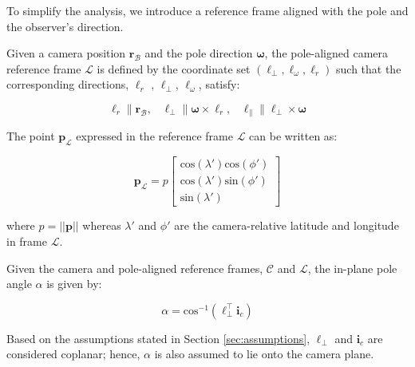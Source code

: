 To simplify the analysis, we introduce a reference frame aligned with the pole and the observer's direction.

\begin{definition}
    \label{eq:L_frame}
    Given a camera position $\mathbf{r}_\mathcal{B}$ and the pole direction $\boldsymbol{\omega}$, the pole-aligned camera reference frame $\mathcal{L}$ is defined by the coordinate set $(\ell_\perp,\ell_\omega,\ell_r)$ such that the corresponding directions, $\boldsymbol{\ell}_r$ , $\boldsymbol{\ell}_\perp$, $\boldsymbol{\ell}_\omega$, satisfy:

    \begin{equation}
        \boldsymbol{\ell}_r \parallel \mathbf{r}_\mathcal{B},\;\;\; \boldsymbol{\ell}_\perp \parallel \boldsymbol{\omega} \times \boldsymbol{\ell}_r,\;\;\; \boldsymbol{\ell}_\parallel \parallel \boldsymbol{\ell}_\perp \times \boldsymbol{\omega}
    \end{equation}

    The point $\mathbf{p}_\mathcal{L}$ expressed in the reference frame $\mathcal{L}$ can be written as:

    \begin{equation}
    \label{eq:p_L}
        \mathbf{p}_\mathcal{L} = p
        \begin{bmatrix}
            \mathrm{cos}(\lambda')\mathrm{cos}(\phi')\\
            \mathrm{cos}(\lambda')\mathrm{sin}(\phi')\\
            \mathrm{sin}(\lambda')
        \end{bmatrix}
    \end{equation}

    where $p=||\mathbf{p}||$ whereas $\lambda'$ and $\phi'$ are the camera-relative latitude and longitude in frame $\mathcal{L}$.
\end{definition}

\begin{definition}
    Given the camera and pole-aligned reference frames, $\mathcal{C}$ and $\mathcal{L}$, the in-plane pole angle $\alpha$ is given by:

    \begin{equation}
        \alpha = \mathrm{cos}^{-1}(\boldsymbol{\ell}^\top_\perp \mathbf{i}_c)
    \end{equation}
\end{definition}

Based on the assumptions stated in Section \ref{sec:assumptions}, $\boldsymbol{\ell}_\perp$ and $\mathbf{i}_c$ are considered coplanar; hence, $\alpha$ is also assumed to lie onto the camera plane.

